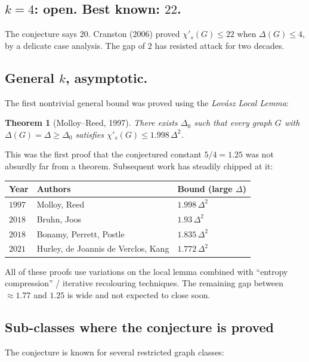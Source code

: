 \documentclass[11pt]{article}
\newcommand{\sci}{\chi'_s}
\newtheorem*{theorem*}{Theorem}
\begin{document}
\subsection*{$k = 4$: open. Best known: $22$.}
The conjecture says $20$. Cranston (2006) proved $\sci(G) \leq 22$
when $\Delta(G) \leq 4$, by a delicate case analysis. The gap of
$2$ has resisted attack for two decades.

\subsection*{General $k$, asymptotic.}
The first nontrivial general bound was proved using the
\emph{Lov\'asz Local Lemma}:

\begin{theorem*}[Molloy--Reed, 1997]
There exists $\Delta_0$ such that every graph $G$ with $\Delta(G) =
\Delta \geq \Delta_0$ satisfies $\sci(G) \leq 1.998\, \Delta^2$.
\end{theorem*}

This was the first proof that the conjectured constant $5/4 = 1.25$
was not absurdly far from a theorem. Subsequent work has steadily
chipped at it:

\begin{center}
\begin{tabular}{l l l}
\textbf{Year} & \textbf{Authors} & \textbf{Bound (large $\Delta$)} \\
\hline
$1997$ & Molloy, Reed                           & $1.998\,\Delta^2$ \\
$2018$ & Bruhn, Joos                            & $1.93\,\Delta^2$  \\
$2018$ & Bonamy, Perrett, Postle                & $1.835\,\Delta^2$ \\
$2021$ & Hurley, de Joannis de Verclos, Kang    & $1.772\,\Delta^2$ \\
\end{tabular}
\end{center}

All of these proofs use variations on the local lemma combined with
``entropy compression'' / iterative recolouring techniques. The
remaining gap between $\approx 1.77$ and $1.25$ is wide and not
expected to close soon.

\subsection*{Sub-classes where the conjecture is proved}

The conjecture is known for several restricted graph classes:
\end{document}
